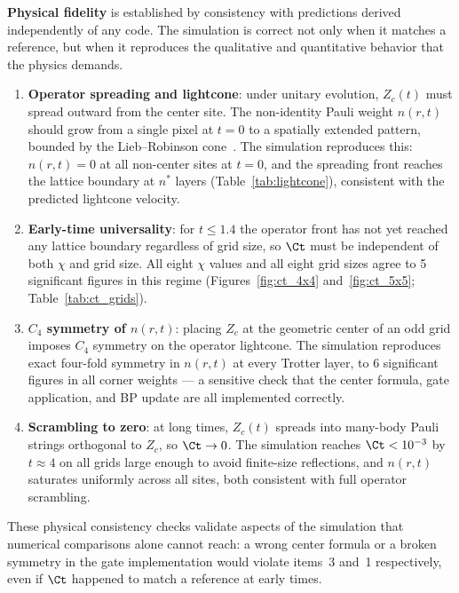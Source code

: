 \medskip
\noindent\textbf{Physical fidelity} is established by consistency with predictions
derived independently of any code.
The simulation is correct not only when it matches a reference, but when it
reproduces the qualitative and quantitative behavior that the physics demands.
\begin{enumerate}
  \item \textbf{Operator spreading and lightcone}: under unitary evolution,
        $Z_c(t)$ must spread outward from the center site.
        The non-identity Pauli weight $n(r,t)$ should grow from a single pixel
        at $t=0$ to a spatially extended pattern, bounded by the Lieb--Robinson
        cone~\citep{liebrobinson}.
        The simulation reproduces this: $n(r,t)=0$ at all non-center sites at
        $t=0$, and the spreading front reaches the lattice boundary at
        $n^*$ layers (Table~\ref{tab:lightcone}), consistent with the predicted
        lightcone velocity.
  \item \textbf{Early-time universality}: for $t \leq 1.4$ the operator front
        has not yet reached any lattice boundary regardless of grid size, so
        $\Ct$ must be independent of both $\chi$ and grid size.
        All eight $\chi$ values and all eight grid sizes agree to 5 significant
        figures in this regime (Figures~\ref{fig:ct_4x4} and~\ref{fig:ct_5x5}; Table~\ref{tab:ct_grids}).
  \item \textbf{$C_4$ symmetry of $n(r,t)$}: placing $Z_c$ at the geometric
        center of an odd grid imposes $C_4$ symmetry on the operator lightcone.
        The simulation reproduces exact four-fold symmetry in $n(r,t)$ at every
        Trotter layer, to 6 significant figures in all corner weights --- a
        sensitive check that the center formula, gate application, and BP update
        are all implemented correctly.
  \item \textbf{Scrambling to zero}: at long times, $Z_c(t)$ spreads into
        many-body Pauli strings orthogonal to $Z_c$, so $\Ct \to 0$.
        The simulation reaches $\Ct < 10^{-3}$ by $t \approx 4$ on all grids
        large enough to avoid finite-size reflections, and $n(r,t)$ saturates
        uniformly across all sites, both consistent with full operator scrambling.
\end{enumerate}
These physical consistency checks validate aspects of the simulation that
numerical comparisons alone cannot reach: a wrong center formula or a broken
symmetry in the gate implementation would violate items~3 and~1 respectively,
even if $\Ct$ happened to match a reference at early times.

